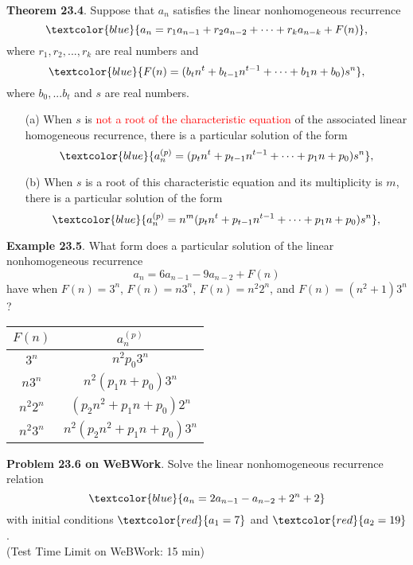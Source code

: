 \documentclass[aspectratio=169]{beamer}
\providecommand{\Blue}[1]{\textcolor{blue}{#1}}
\providecommand{\Red}[1]{\textcolor{red}{#1}}
\begin{document}
\begin{frame}[plain]{}

 {\bf  Theorem 23.4}. Suppose that ${a_n}$ satisfies the linear nonhomogeneous recurrence
    \[ \Blue{ a_n = r_1a_{n-1} + r_{2}a_{n-2}+\cdots + r_ka_{n-k} + F(n)}, 
   \]
   where $r_1, r_2, ..., r_k$ are real numbers  and
   \[ \Blue{ F(n) = (b_tn^t+b_{t-1}n^{t-1}+\cdots + b_1n+b_0)s^n},\]
   where $b_0,...b_t$ and $s$ are real numbers.
   \begin{itemize}
     \item[(a)] When $s$ is \Red{not a root of the characteristic equation} of the associated linear homogeneous
            recurrence, there is a particular solution of the form
             \[ \Blue{ a_n^{(p)} = (p_tn^t+p_{t-1}n^{t-1}+\cdots + p_1n+p_0)s^n},\]
      \item[(b)] When $s$ is a root of this characteristic equation and its multiplicity is $m$, 
              there is a particular solution of the form
               \[ \Blue{ a_n^{(p)} = n^m (p_tn^t+p_{t-1}n^{t-1}+\cdots + p_1n+p_0)s^n},\]
  \end{itemize}
   
    
\end{frame}

\begin{frame}[plain]{}

{\bf Example 23.5}. What form does a particular solution of the linear nonhomogeneous recurrence
  \[ a_n = 6a_{n-1}-9a_{n-2}+F(n) \]
  have when $F(n) = 3^n$, $F(n) = n3^n$, $F(n) = n^2 2^n$, and $F(n) = (n^2+1)3^n$?  
  \smallskip
  
  \begin{center}
  \begin{tabular}{|c|c|} \hline 
   $F(n)$ & $a_n^{(p)}$  \\ \hline
     $3^n$ &  $n^2p_0 3^n$  \\ \hline
      $n3^n$ &  $n^2(p_1n+p_0)3^n$  \\ \hline
          $n^2 2^n$ &  $(p_2n^2+p_1n+p_0)2^n$  \\ \hline
            $n^2 3^n$ &  $n^2(p_2n^2+p_1n+p_0)3^n$  \\ \hline
  \end{tabular}
  \end{center}
\pause

\medskip

{\bf Problem 23.6 on WeBWork}. Solve the linear nonhomogeneous recurrence relation
\[
\Blue{a_n = 2a_{n-1} - a_{n-2} + 2^n + 2}
\]
with initial conditions \(\Red{a_1 = 7}\) and \(\Red{a_2 = 19}\). \\
  (Test Time Limit on WeBWork: 15 min)

\end{frame}
\end{document}

